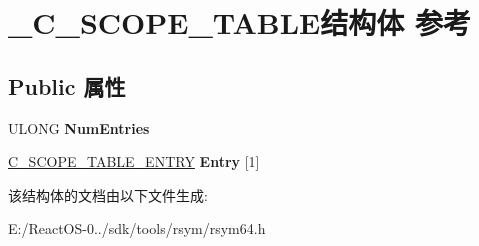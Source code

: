 \hypertarget{struct___c___s_c_o_p_e___t_a_b_l_e}{}\section{\+\_\+\+C\+\_\+\+S\+C\+O\+P\+E\+\_\+\+T\+A\+B\+L\+E结构体 参考}
\label{struct___c___s_c_o_p_e___t_a_b_l_e}
\subsection*{Public 属性}
\begin{DoxyCompactItemize}
\item 
\mbox{\label{struct___c___s_c_o_p_e___t_a_b_l_e_a897d1545fb67fec3b882b7f4466018c9}} 
U\+L\+O\+NG {\bfseries Num\+Entries}
\item 
\mbox{\label{struct___c___s_c_o_p_e___t_a_b_l_e_abb61f1ffcb578533b2b90e4ae9d417b7}} 
\hyperlink{struct___c___s_c_o_p_e___t_a_b_l_e___e_n_t_r_y}{C\+\_\+\+S\+C\+O\+P\+E\+\_\+\+T\+A\+B\+L\+E\+\_\+\+E\+N\+T\+RY} {\bfseries Entry} \mbox{[}1\mbox{]}
\end{DoxyCompactItemize}


该结构体的文档由以下文件生成\+:\begin{DoxyCompactItemize}
\item 
E\+:/\+React\+O\+S-\/0../sdk/tools/rsym/rsym64.\+h\end{DoxyCompactItemize}
